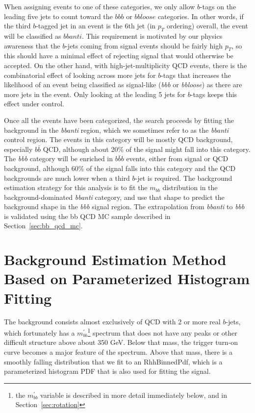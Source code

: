 When assigning events to one of these categories, we only allow $b$-tags on the leading
five jets to count toward the $bbb$ or $bbloose$ categories.  In other words, if the third
$b$-tagged jet in an event is the 6th jet (in $p_T$ ordering) overall, the event 
will be classified as $bbanti$.  This requirement is motivated by our physics awareness that
the $b$-jets coming from signal events should be fairly high $p_T$, so this should have
a minimal effect of rejecting signal that would otherwise be accepted.  On the other
hand, with high-jet-multiplicity QCD events, there is the combinatorial effect of looking across
more jets for $b$-tags that increases the likelihood of an event being classified as signal-like
(\textit{bbb} or \textit{bbloose}) as there are more jets in the event.  Only looking at the leading 5 jets
for $b$-tags keeps this effect under control. 

Once all the events have been categorized, the search proceeds by fitting the background
in the \textit{bbanti} region, which we sometimes refer to as the \textit{bbanti}
control region.  The events in this category will be mostly QCD background, especially
$b\bar{b}$ QCD, although about 20\% of the signal might fall into this category.  The 
\textit{bbb} category will be enriched in $b\bar{b}b$ events, either from signal
or QCD background, although 60\% of the signal falls into this category and the QCD 
backgrounds are much lower when a third $b$-jet is required.  The background estimation
strategy for this analysis is to fit the $m_{bb}$ distribution in the background-dominated
\textit{bbanti} category, and use that shape to predict the background shape in the \textit{bbb}
signal region.   The extrapolation from \textit{bbanti} to \textit{bbb} is validated using the 
bb QCD MC sample described in Section~\ref{sec:bb_qcd_mc}.

\section{Background Estimation Method Based on Parameterized Histogram Fitting}
The background consists almost exclusively of QCD with 2 or more real $b$-jets, which 
fortunately has a $m^{'}_{bb}$\footnote{the $m^{'}_{bb}$ variable is described in more detail
immediately below, and in Section~\ref{sec:rotation}} spectrum that does not have any peaks or other difficult
structure above about 350 GeV.  Below that mass, the trigger turn-on curve becomes
a major feature of the spectrum.  Above that mass, there
is a smoothly falling distribution that we fit to an RhhBinnedPdf, which is a parameterized
histogram PDF that is also used for fitting the signal.

